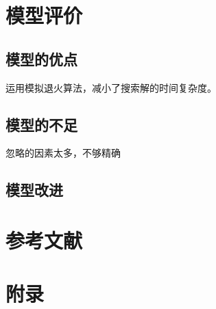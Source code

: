 \documentclass[UTF8]{ctexart}
\begin{document}
	\section{模型评价}
	\subsection{模型的优点}
	运用模拟退火算法，减小了搜索解的时间复杂度。
	\subsection{模型的不足}
	忽略的因素太多，不够精确
	\subsection{模型改进}
	
	\section{参考文献}
	
	\section{附录}
	\begin{appendices}
		
	\end{appendices}
	
\end{document}
